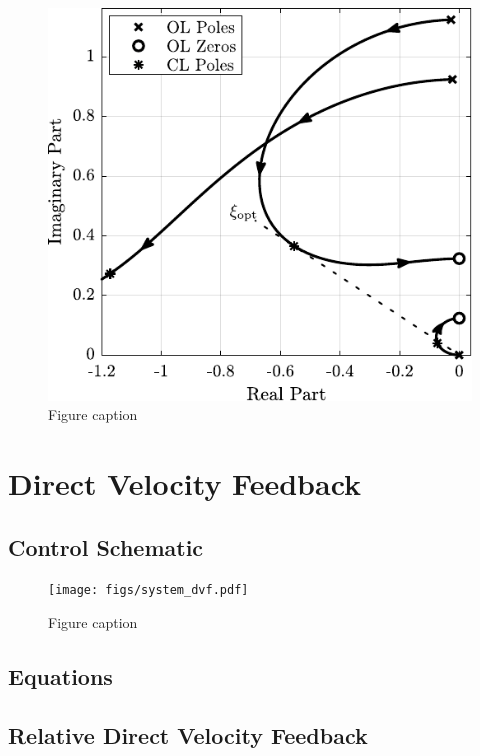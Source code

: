 \documentclass{ISMA_USD2020}
\begin{document}
\begin{figure}[htbp]
\centering
\includegraphics[scale=1]{figs/root_locus_opt_gain_iff_kp.pdf}
\caption{\label{fig:root_locus_opt_gain_iff_kp}Figure caption}
\end{figure}

\section{Direct Velocity Feedback}
\label{sec:orgda2e325}
\subsection{Control Schematic}
\label{sec:org0e84009}

\begin{figure}[htbp]
\centering
\texttt{[image: figs/system\_dvf.pdf]}
\caption{\label{fig:system_dvf}Figure caption}
\end{figure}

\subsection{Equations}
\label{sec:org7cc244c}


\subsection{Relative Direct Velocity Feedback}
\label{sec:org668d842}
\end{document}
